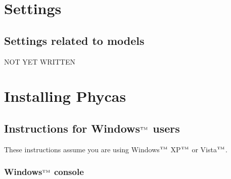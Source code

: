 \documentclass[10pt]{article}
\newcommand{\trademark}[1]{#1${}^{\mbox{\tiny TM}}$}
\begin{document}
\section{Settings}\label{sec:phycassettings}



%

\subsection{Settings related to models}\label{subsec:modelsettings}
NOT YET WRITTEN
%

\section{Installing Phycas}\label{sec:install}
\subsection{Instructions for \trademark{Windows} users} 

These instructions assume you are using \trademark{Windows} \trademark{XP} or \trademark{Vista}.

\subsubsection{\trademark{Windows} console}
\end{document}
